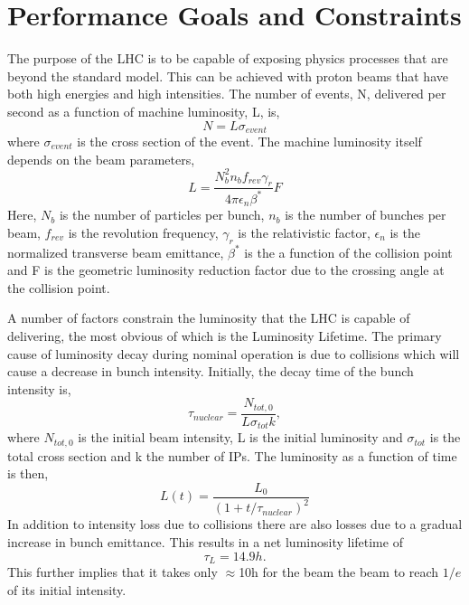 \section{Performance Goals and Constraints}
The purpose of the LHC is to be
capable of exposing physics processes that are beyond the standard
model. This can be achieved with proton beams %
that have both high energies and high intensities.
The number of events, N, delivered per second as a function
of machine luminosity, L, is,
\begin{equation}
N=L\sigma_{event}
\end{equation}
where $\sigma_{event}$ is the cross section of the event.
The machine luminosity itself depends on the beam parameters,
\begin{equation}
L=\frac{N_{b}^{2}n_{b}f_{rev}\gamma_{r}}{4\pi \epsilon_{n}\beta^{*}}F
\end{equation}
Here, $N_{b}$ is the number of particles per bunch, $n_{b}$
is the number of bunches per beam, $f_{rev}$ is the
revolution frequency, $\gamma_{r}$ is the relativistic factor, 
$\epsilon_{n}$ is the normalized transverse beam
emittance, $\beta^{*}$ is the a function of the collision point
and F is the geometric luminosity reduction factor due to the crossing
angle at the collision point. 

A number of factors constrain the luminosity that the LHC is capable
of delivering, the most obvious of which is the Luminosity Lifetime.
The primary cause of luminosity decay during nominal operation
is due to collisions which will cause a decrease in bunch intensity.
Initially, the decay time of the bunch intensity is,
\begin{equation}
\tau_{nuclear}=\frac{N_{tot,0}}{L\sigma_{tot}k},
\end{equation}
where $N_{tot,0}$ is the initial beam intensity, L is the initial
luminosity and $\sigma_{tot}$ is the total cross section and 
k the number of IPs.
The luminosity as a function of time is then,
\begin{equation}
L(t)=\frac{L_{0}}{(1+t/\tau_{nuclear})^{2}}
\end{equation}
In addition to intensity loss due to collisions there are also
losses due to a gradual increase in bunch emittance. This
results in a net luminosity lifetime of 
\begin{equation}
\tau_{L} = 14.9 h .
\end{equation}
This further implies that it takes only $\approx$10h for the
beam the beam to reach $1/e$ of its initial intensity.

